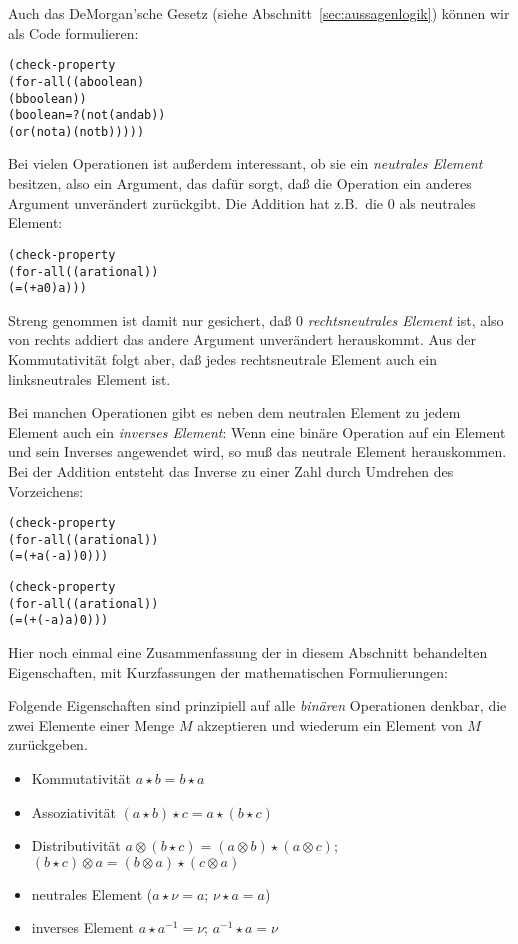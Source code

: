 Auch das \textrm{DeMorgan'sche Gesetz}
(siehe Abschnitt~\ref{sec:aussagenlogik}) können wir als Code
formulieren:
%
\begin{alltt}
(check-property
 (for-all ((a boolean)
           (b boolean))
   (boolean=? (not (and a b))
              (or (not a) (not b)))))
\end{alltt}
%
Bei vielen Operationen ist außerdem interessant, ob sie ein
\textit{neutrales Element} besitzen, also ein
Argument, das dafür sorgt, daß die Operation ein anderes Argument
unverändert zurückgibt.  Die Addition hat z.B.\ die $0$ als neutrales
Element:
%
\begin{alltt}
(check-property
  (for-all ((a rational))
    (= (+ a 0) a)))
\end{alltt}
%
Streng genommen ist damit nur gesichert, daß $0$ \textit{rechtsneutrales
  Element} ist, also von rechts addiert das andere Argument
unverändert herauskommt.  Aus der Kommutativität folgt aber, daß jedes
rechtsneutrale Element auch ein linksneutrales Element ist.

Bei manchen Operationen gibt es neben dem neutralen Element zu jedem
Element auch ein \textit{inverses Element}:
Wenn eine binäre Operation auf ein Element und sein Inverses
angewendet wird, so muß das neutrale Element herauskommen.  Bei der
Addition entsteht das Inverse zu einer Zahl durch Umdrehen des
Vorzeichens:
%
\begin{alltt}
(check-property
 (for-all ((a rational))
   (= (+ a (- a)) 0)))

(check-property
 (for-all ((a rational))
   (= (+ (- a) a) 0)))
\end{alltt}
%
Hier noch einmal eine Zusammenfassung der in diesem Abschnitt
behandelten Eigenschaften, mit Kurzfassungen der mathematischen
Formulierungen:

\begin{mantra}
%
Folgende Eigenschaften sind prinzipiell auf alle \textit{binären}
Operationen denkbar, die zwei Elemente einer Menge $M$ akzeptieren
und wiederum ein Element von $M$ zurückgeben.
\begin{itemize}
\item Kommutativität $a \star b = b \star a$
\item Assoziativität $(a \star b) \star c = a \star (b \star c)$
\item Distributivität $a \otimes (b \star c) = (a \otimes b) \star (a
  \otimes c)$; $(b \star c) \otimes a = (b \otimes a) \star (c
  \otimes a)$
\item neutrales Element ($a\star \nu = a$; $\nu\star a = a$)
\item inverses Element $a\star a^{-1} = \nu$; $a^{-1}\star a = \nu$
\end{itemize}
\end{mantra}

